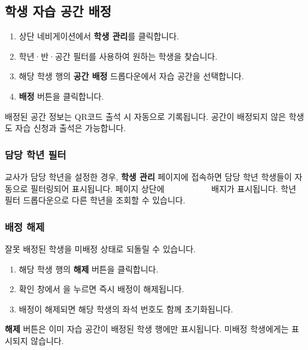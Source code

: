 \documentclass[a4paper,12pt]{article}
\newcommand{\menu}[1]{\textcolor{primary}{\textbf{#1}}}
\newcommand{\key}[1]{\fbox{\small\texttt{#1}}}
\newcommand{\badge}[2]{\colorbox{#1}{\small\textcolor{white}{\textbf{#2}}}}
\begin{document}
\subsection{학생 자습 공간 배정}

\begin{enumerate}[leftmargin=1.5em]
    \item 상단 네비게이션에서 \menu{학생 관리}를 클릭합니다.
    \item 학년·반·공간 필터를 사용하여 원하는 학생을 찾습니다.
    \item 해당 학생 행의 \menu{공간 배정} 드롭다운에서 자습 공간을 선택합니다.
    \item \menu{배정} 버튼을 클릭합니다.
\end{enumerate}

\begin{notebox}
  배정된 공간 정보는 QR코드 출석 시 자동으로 기록됩니다.
  공간이 배정되지 않은 학생도 자습 신청과 출석은 가능합니다.
\end{notebox}

\subsubsection{담당 학년 필터}

교사가 담당 학년을 설정한 경우, \menu{학생 관리} 페이지에 접속하면 담당 학년 학생들이
자동으로 필터링되어 표시됩니다. 페이지 상단에 \badge{primary}{N학년 담당} 배지가 표시됩니다.
학년 필터 드롭다운으로 다른 학년을 조회할 수 있습니다.

\subsubsection{배정 해제}

잘못 배정된 학생을 미배정 상태로 되돌릴 수 있습니다.

\begin{enumerate}[leftmargin=1.5em]
    \item 해당 학생 행의 \menu{해제} 버튼을 클릭합니다.
    \item 확인 창에서 \key{확인}을 누르면 즉시 배정이 해제됩니다.
    \item 배정이 해제되면 해당 학생의 좌석 번호도 함께 초기화됩니다.
\end{enumerate}

\begin{notebox}
  \menu{해제} 버튼은 이미 자습 공간이 배정된 학생 행에만 표시됩니다.
  미배정 학생에게는 표시되지 않습니다.
\end{notebox}
\end{document}
